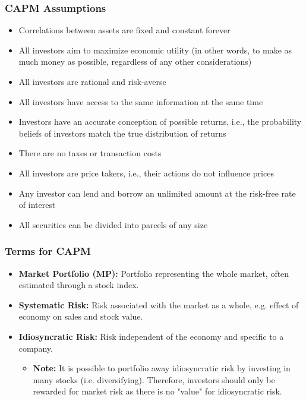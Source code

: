    \subsubsection{CAPM Assumptions}
    \begin{intuition}
        \begin{itemize}
            \item Correlations between assets are fixed and constant forever
            \item All investors aim to maximize economic utility (in other words, to make as much money as possible, regardless of any other considerations)
            \item All investors are rational and risk-averse
            \item All investors have access to the same information at the same time
            \item Investors have an accurate conception of possible returns, i.e., the probability beliefs of investors match the true distribution of returns
            \item There are no taxes or transaction costs
            \item All investors are price takers, i.e., their actions do not influence prices
            \item Any investor can lend and borrow an unlimited amount at the risk-free rate of interest
            \item All securities can be divided into parcels of any size
        \end{itemize}
    \end{intuition}

    \subsubsection{Terms for CAPM}
    \begin{terminology}
        \begin{itemize}
            \item \textbf{Market Portfolio (MP):} Portfolio representing the whole market, often estimated through a stock index.
        
            \item \textbf{Systematic Risk:} Risk associated with the market as a whole, e.g. effect of economy on sales and stock value.
            
            \item \textbf{Idiosyncratic Risk:} Risk independent of the economy and specific to a company.
            \begin{itemize}
                \item \textbf{Note:} It is possible to portfolio away idiosyncratic risk by investing in many stocks (i.e. diversifying). Therefore, investors should only be rewarded for market risk as there is no "value" for idiosyncratic risk.
            \end{itemize}
        \end{itemize}
    \end{terminology}

